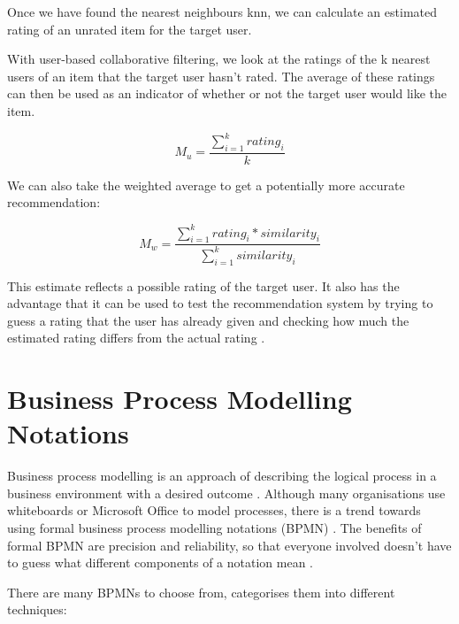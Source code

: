 Once we have found the nearest neighbours knn, we can calculate an estimated rating of an unrated item for the target user. 

With user-based collaborative filtering, we look at the ratings of the k nearest users of an item that the target user hasn't rated. The average of these ratings can then be used as an indicator of whether or not the target user would like the item.

\begin{equation}
M_{u} = \frac{\sum_{i=1}^{k}{rating_i}}{k}
\label{mean}
\end{equation}

We can also take the weighted average to get a potentially more accurate recommendation:

\begin{equation}
M_{w} = \frac{\sum_{i=1}^{k}{rating_i * similarity_i}}{\sum_{i=1}^{k}{similarity_i}}
\label{weightedMean}
\end{equation}


This estimate reflects a possible rating of the target user. It also has the advantage that it can be used to test the recommendation system by trying to guess a rating that the user has already given and checking how much the estimated rating differs from the actual rating \cite{miningOfMassiveDatasets}. 

\section{Business Process Modelling Notations}

\label{sec:background_bpmn}

Business process modelling is an approach of describing the logical process in a business environment with a desired outcome \cite{bpm_review_framework}. Although many organisations use whiteboards or Microsoft Office to model processes, there is a trend towards using formal business process modelling notations (BPMN) \cite{ebpma-tec-standards, bpm_review_framework}. The benefits of formal BPMN are precision and reliability, so that everyone involved doesn't have to guess what different components of a notation mean \cite{ebpma-tec-standards}.

There are many BPMNs to choose from, \cite{bpm_review_framework} categorises them into different techniques:

